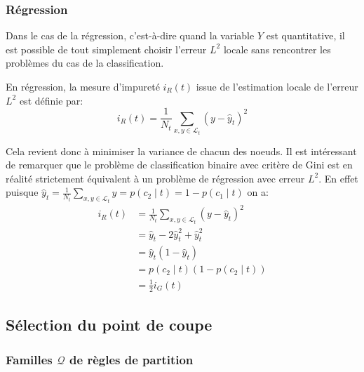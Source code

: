 \subsubsection{Régression}

Dans le cas de la régression, c'est-à-dire quand la variable $Y$ est quantitative, il est possible de tout simplement choisir l'erreur $L^2$ locale sans rencontrer les problèmes du cas de la classification.

\begin{definition}
    En régression, la mesure d'impureté $i_R (t)$ issue de l'estimation locale de l'erreur $L^2$ est définie par:
    \begin{equation*}
        i_R (t) = \frac{1}{N_t} \sum_{x,y \in \mathcal{L}_t} (y-\hat{y}_t)^2
    \end{equation*}
\end{definition}
Cela revient donc à minimiser la variance de chacun des noeuds. Il est intéressant de remarquer que le problème de classification binaire avec critère de Gini est en réalité strictement équivalent à un problème de régression avec erreur $L^2$. En effet puisque $\hat{y}_t = \frac{1}{N_t} \sum_{x,y \in \mathcal{L}_t} y = p(c_2 \mid t) = 1 - p(c_1 \mid t)$ on a:
\begin{align*}
    i_R (t) &= \frac{1}{N_t} \sum_{x,y \in \mathcal{L}_t} (y-\hat{y}_t)^2 \\
            &= \hat{y}_t - 2 \hat{y}_t^2 + \hat{y}_t^2 \\
            &= \hat{y}_t (1 - \hat{y}_t) \\
            &= p(c_2 \mid t) (1-p(c_2 \mid t)) \\
            &= \frac{1}{2} i_G (t)
\end{align*}

\subsection{Sélection du point de coupe}

\subsubsection{Familles $\mathcal{Q}$ de règles de partition}

